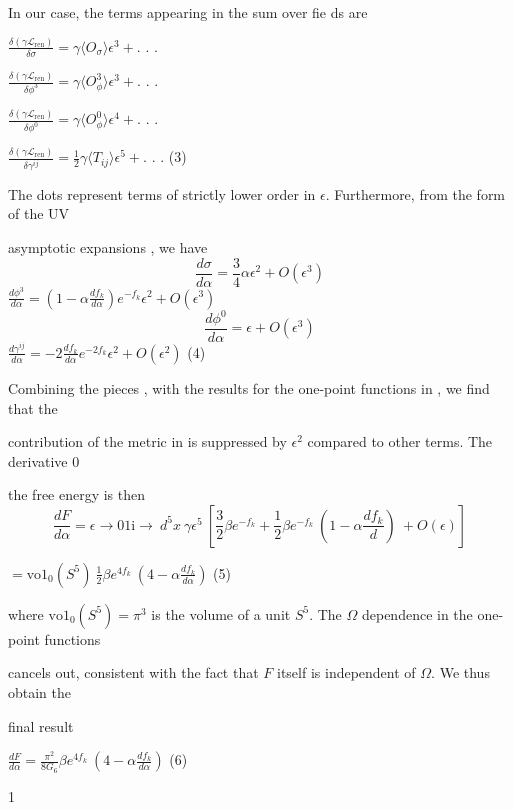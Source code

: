 \documentclass[a4paper,12pt]{article}
\begin{document}
In our case, the terms appearing in the sum over fie ds are

$\displaystyle \frac{\delta(\gamma \mathcal{L}_{\mathrm{r}\mathrm{e}\mathrm{n}})}{\delta\sigma}= \gamma\langle O_{\sigma}\rangle\epsilon^{3}+.$ . .

$\displaystyle \frac{\delta(\gamma \mathcal{L}_{\mathrm{r}\mathrm{e}\mathrm{n}})}{\delta\phi^{3}}= \gamma\langle O_{\phi}^{3}\rangle\epsilon^{3}+.$ . .

$\displaystyle \frac{\delta(\gamma \mathcal{L}_{\mathrm{r}\mathrm{e}\mathrm{n}})}{\delta\phi^{0}}= \gamma\langle O_{\phi}^{0}\rangle\epsilon^{4}+.$ . .

$\displaystyle \frac{\delta(\gamma \mathcal{L}_{\mathrm{r}\mathrm{e}\mathrm{n}})}{\delta\gamma^{ij}}=\frac{1}{2} \gamma\langle T_{ij}\rangle\epsilon^{5}+.$ . . (3)

The dots represent terms of strictly lower order in $\epsilon$. Furthermore, from the form of the UV

asymptotic expansions , we have
$$
\frac{d\sigma}{d\alpha}=\frac{3}{4}\alpha\epsilon^{2}+O(\epsilon^{3})
$$
$\displaystyle \frac{d\phi^{3}}{d\alpha}= (1-\displaystyle \alpha\frac{df_{k}}{d\alpha})e^{-f_{k}}\epsilon^{2}+O(\epsilon^{3})$
$$
\frac{d\phi^{0}}{d\alpha}=\epsilon+O(\epsilon^{3})
$$
$\displaystyle \frac{d\gamma^{ij}}{d\alpha}=-2\frac{df_{k}}{d\alpha}e^{-2f_{k}}\epsilon^{2}+O(\epsilon^{2})$ (4)

Combining the pieces , with the results for the one-point functions in , we find that the

contribution of the metric in is suppressed by $\epsilon^{2}$ compared to other terms. The derivative $0$

the free energy is then
$$
\frac{dF}{d\alpha}=\epsilon\rightarrow 01\mathrm{i}\rightarrow\ d^{5}x\ \gamma\epsilon^{5}\ [\frac{3}{2}\beta e^{-f_{k}}+\frac{1}{2}\beta e^{-f_{k}}\ (1-\alpha\frac{df_{k}}{d})\ +O(\epsilon)]
$$
\begin{center}
$=\displaystyle \mathrm{v}\mathrm{o}1_{0}(S^{5})\ \frac{1}{2}\beta e^{4f_{k}}\ (4-\alpha\frac{df_{k}}{d\alpha})$   (5)
\end{center}
where $\mathrm{v}\mathrm{o}1_{0}(S^{5})=\pi^{3}$ is the volume of a unit $S^{5}$. The $\Omega$ dependence in the one-point functions

cancels out, consistent with the fact that $F$ itself is independent of $\Omega$. We thus obtain the

final result
\begin{center}
$\displaystyle \frac{dF}{d\alpha}=\frac{\pi^{2}}{8G_{6}}\beta e^{4f_{k}}\ (4-\alpha\frac{df_{k}}{d\alpha})$   (6)
\end{center}
1
\end{document}
